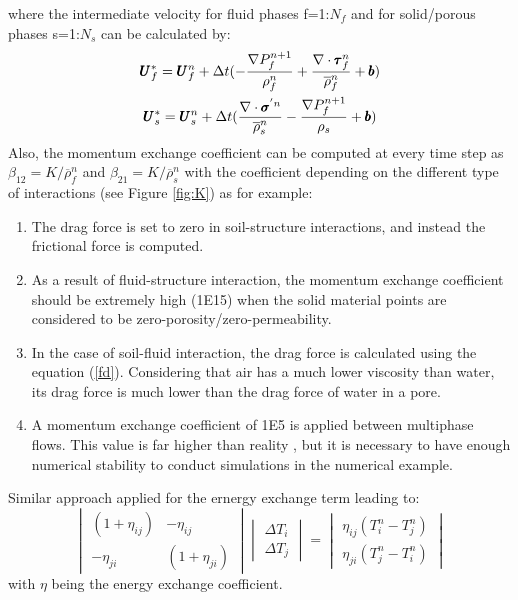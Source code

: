 \documentclass[preprint,12pt]{elsarticle}
\begin{document}
%
%
where the intermediate velocity for fluid phases f=1:$N_f$ and for solid/porous phases s=1:$N_s$ can be calculated by:
%
\begin{equation}
\begin{gathered}
\pmb{U}_{f}^{*} = \pmb{U}_{f}^{n} + \Delta{t} (-\frac{\nabla P_{f}^{n+1}}{\rho_f^n}  + \frac {\nabla \cdot \pmb{\tau}_f^{n}}{\overline{\rho}^n_{f}} + \pmb{b}) \\
\pmb{U}_{s}^{*} = \pmb{U}_{s}^{n} + \Delta{t} (\frac{\nabla \cdot \pmb{\sigma}^{'n}}{\overline{\rho}^n_{s}}    - \frac{\nabla P_{f}^{n+1}}{\rho_s}  + \pmb{b})
\end {gathered}
\end {equation}
%
%
Also, the momentum exchange coefficient can be computed at every time step as $\beta_{12} = K/\overline{\rho}_{f}^n$ and $\beta_{21} = K/\overline{\rho}_{s}^n$ with the coefficient depending on the different type of interactions (see Figure \ref{fig:K}) as for example: \\
\begin{enumerate}
\item The drag force is set to zero in soil-structure interactions, and instead the frictional force is computed.
\item As a result of fluid-structure interaction, the momentum exchange coefficient should be extremely high (1E15) when the solid material points are considered to be zero-porosity/zero-permeability.
\item In the case of soil-fluid interaction, the drag force is calculated using the equation (\ref{fd}). Considering that air has a much lower viscosity than water, its drag force is much lower than the drag force of water in a pore.
\item A momentum exchange coefficient of 1E5 is applied between multiphase flows. This value is far higher than reality \cite{Stewart1974}, but it is necessary to have enough numerical stability to conduct simulations in the numerical example.
\end {enumerate}
Similar approach applied for the ernergy exchange term leading to:
%
%
\[ \begin{vmatrix} (1 + \eta_{ij})  &  -\eta_{ij} \\
                  -\eta_{ji}       &  (1 + \eta_{ji})
    \end {vmatrix}
    \begin{vmatrix} \Delta T_{i} \\
                    \Delta T_{j}
    \end {vmatrix}
    =
    \begin{vmatrix}  \eta_{ij}(T_{i}^{n} - T_{j}^{n}) \\
                    \eta_{ji}(T_{j}^{n} - T_i^{n})
    \end {vmatrix}                
\]
with $\eta$ being the energy exchange coefficient.
\end{document}
